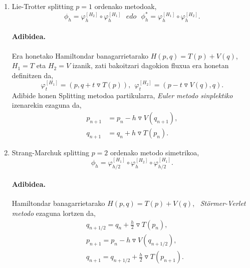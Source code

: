 \begin{enumerate}

\item Lie-Trotter splitting $p=1$ ordenako metodoak,
\begin{equation}
\phi_h = \varphi_h^{[H_2]} \circ \varphi_h^{[H_1]} \ \ \ edo \ \ \ \phi_h^{*} = \varphi_h^{[H_1]} \circ \varphi_h^{[H_2]}.
\label{eq:LieT}
\end{equation}


\paragraph*{Adibidea.}

Era honetako Hamiltondar banagarrietarako $H(p,q)=T(p)+V(q)$, $H_1=T$ eta $H_2=V$ izanik, zati bakoitzari dagokion fluxua era honetan definitzen da,
\begin{equation*}
\varphi_t^{[H_1]}=(p,q+t\triangledown T(p)), \ \ \varphi_t^{[H_2]}=(p-t\triangledown V(q),q). 
\end{equation*}
Adibide honen Splitting metodoa partikularra, \emph{Euler metodo sinplektiko} izenarekin ezaguna da,
\begin{align*}
p_{n+1}&=p_{n}-h \triangledown V(q_{n+1}), \\
q_{n+1}&=q_{n}+h \triangledown T(p_n).
\end{align*}  
   

\item Strang-Marchuk splitting $p=2$ ordenako metodo simetrikoa,
\begin{equation}
\phi_h =  \varphi_{{h}/{2}}^{[H_1]} \circ \varphi_h^{[H_2]} \circ \varphi_{{h}/{2}}^{[H_1]}.
\end{equation} 

\paragraph*{Adibidea.}

Hamiltondar banagarrietarako $H(p,q)=T(p)+V(q)$, ~\emph{Störmer-Verlet metodo} ezaguna lortzen da,
\begin{align*}
&q_{{n+1}/{2}} =q_n+\frac{h}{2} \triangledown T(p_n), \\
&p_{n+1} =p_n-h \triangledown V(q_{{n+1}/{2}}), \\
&q_{n+1} =q_{{n+1}/{2}}+\frac{h}{2} \triangledown T(p_{n+1}).
\end{align*}

\end{enumerate}

